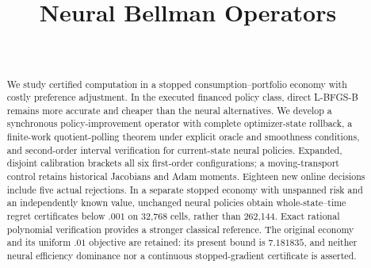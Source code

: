 

\begin{frontmatter}
\title{Neural Bellman Operators}
\begin{aug}
\author[id=au1,addressref={add1}]{~}
\address[id=add1]{}
\end{aug}
\begin{abstract}
We study certified computation in a stopped consumption--portfolio economy with costly preference adjustment. In the executed financed policy class, direct L-BFGS-B remains more accurate and cheaper than the neural alternatives. We develop a synchronous policy-improvement operator with complete optimizer-state rollback, a finite-work quotient-polling theorem under explicit oracle and smoothness conditions, and second-order interval verification for current-state neural policies. Expanded, disjoint calibration brackets all six first-order configurations; a moving-transport control retains historical Jacobians and Adam moments. Eighteen new online decisions include five actual rejections. In a separate stopped economy with unspanned risk and an independently known value, unchanged neural policies obtain whole-state--time regret certificates below $.001$ on 32,768 cells, rather than 262,144. Exact rational polynomial verification provides a stronger classical reference. The original economy and its uniform $.01$ objective are retained: its present bound is $7.181835$, and neither neural efficiency dominance nor a continuous stopped-gradient certificate is asserted.
\end{abstract}
\begin{keyword}\end{keyword}
\end{frontmatter}





\begin{appendix}

\end{appendix}
\clearpage


